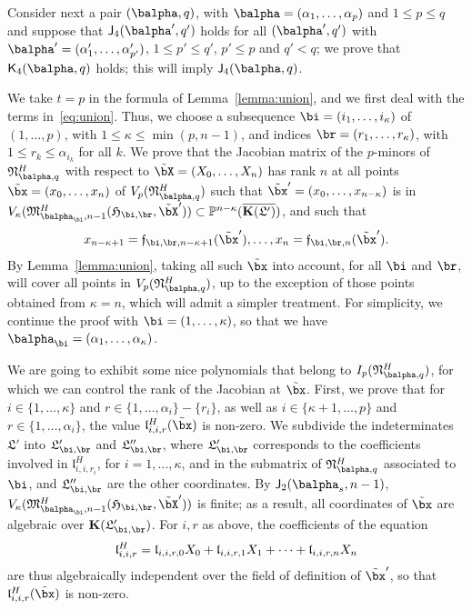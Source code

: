 \documentclass[12pt]{article}
\begin{document}
Consider next a pair $(\balpha,q)$, with
$\balpha=(\alpha_1,\dots,\alpha_p)$ and $1 \le p \le q$ and suppose
that $\assI_4(\balpha',q')$ holds for all $(\balpha',q')$ with
$\balpha'=(\alpha'_1,\dots,\alpha'_{p'})$, $1 \le p' \le q'$, $p' \le
p$ and $q' < q$; we prove that $\assJ_4(\balpha,q)$ holds; this will
imply $\assI_4(\balpha,q)$.

We take $t=p$ in the formula of Lemma~\ref{lemma:union}, and we first
deal with the terms in~\eqref{eq:union}.  Thus, we choose a
subsequence $\bi=(i_1,\dots,i_\kappa)$ of $(1,\dots,p)$, with $1 \le \kappa\le
\min(p,n-1)$, and indices $\br=(r_1,\dots,r_\kappa)$, with $ 1\le r_k \le
\alpha_{i_k}$ for all $k$. We prove that the Jacobian matrix of the $p$-minors of $\mathfrak{N}^H_{\balpha,q}$
with respect to $\tilde\bX=(X_0,\dots,X_n)$ has rank $n$ at all points $\tilde\bx=(x_0,\dots,x_n)$ of
$V_p(\mathfrak{N}^H_{\balpha,q})$  such that
$\tilde\bx'=(x_0,\dots,x_{n-\kappa})$ is in
$V_\kappa(\mathfrak{M}^H_{\balpha_\bi,n-1}(\mathfrak{H}_{\bi,\br},\tilde\bX')) \subset
\P^{n-\kappa}(\KKGpbar)$, and such that
\begin{align}\label{eq:subsX}
  x_{n-\kappa+1}=\mathfrak{f}_{\bi,\br,n-\kappa+1}(\tilde\bx'),\dots,x_{n}=\mathfrak{f}_{\bi,\br,n}(\tilde\bx').
\end{align}
By Lemma~\ref{lemma:union}, taking all such $\tilde\bx$ into account,
for all $\bi$ and $\br$, will cover all points in
$V_p(\mathfrak{N}^H_{\balpha,q})$, up to the exception of those points
obtained from $\kappa=n$, which will admit a simpler treatment.
For simplicity, we continue the proof with $\bi=(1,\dots,\kappa)$, so
that we have $\balpha_\bi=(\alpha_1,\dots,\alpha_\kappa)$.  

We are going to exhibit some nice polynomials that belong to
$I_p(\mathfrak{N}^H_{\balpha,q})$, for which we can control the rank
of the Jacobian at $\tilde\bx$. First, we prove that for
$i\in\{1,\dots,\kappa\}$ and $r \in \{1,\dots,\alpha_i\}-\{r_i\}$, as
well as $i\in\{\kappa+1,\dots,p\}$ and $r \in \{1,\dots,\alpha_i\}$,
the value $\mathfrak{l}^H_{i,i,r}(\tilde\bx)$ is non-zero.  We
subdivide the indeterminates $\mathfrak{L}'$ into $\mathfrak{L}'_{\bi,\br}$ and
$\mathfrak{L}''_{\bi,\br}$, where $\mathfrak{L}'_{\bi,\br}$ corresponds to the
coefficients involved in $\mathfrak{l}^H_{i,i,r_i}$, for $i=1,\dots,\kappa$,
and in the submatrix of $\mathfrak{N}^H_{\balpha,q}$ associated to $\bi$,
and $\mathfrak{L}''_{\bi,\br}$ are the other coordinates.  By
$\assI_2(\balpha_s,n-1)$,
$V_\kappa(\mathfrak{M}^H_{\balpha_\bi,n-1}(\mathfrak{H}_{\bi,\br},\tilde\bX'))$ is finite; as
a result, all coordinates of $\tilde\bx$ are algebraic over
$\KK(\mathfrak{L}'_{\bi,\br})$. For $i,r$ as above, the coefficients
of the equation
$$\mathfrak{l}^H_{i,i,r} = \frak{l}_{i,i,r,0} X_0+ \frak{l}_{i,i,r,1}
X_1 +\cdots + \frak{l}_{i,i,r,n} X_n$$ are thus algebraically independent
over the field of definition of $\tilde\bx'$, so that $\mathfrak{l}^H_{i,i,r}(\tilde\bx)$
is non-zero.
\end{document}
